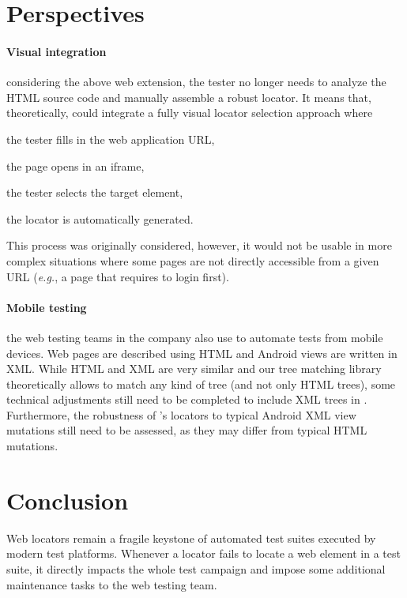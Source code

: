 \section{Perspectives}\label{cerberus:sec:perspectives}
\paragraph{Visual integration}
considering the above \erratum web extension, the tester no longer needs to analyze the HTML source code and manually assemble a robust locator.
It means that, theoretically, \cerberus could integrate a fully visual locator selection approach where
\begin{inparaenum}[\em (i)]
    \item the tester fills in the web application URL,
    \item the page opens in an iframe,
    \item the tester selects the target element,
    \item the \erratum locator is automatically generated.
\end{inparaenum}
This process was originally considered, however, it would not be usable in more complex situations where some pages are not directly accessible from a given URL (\emph{e.g.}, a page that requires to login first).

\paragraph{Mobile testing}
the web testing teams in the \laredoute{} company also use \cerberus to automate tests from mobile devices.
Web pages are described using HTML and Android views are written in XML.
While HTML and XML are very similar and our tree matching library theoretically allows \erratum to match any kind of tree (and not only HTML trees), some technical adjustments still need to be completed to include XML trees in \cerberus.
Furthermore, the robustness of \erratum's locators to typical Android XML view mutations still need to be assessed, as they may differ from typical HTML mutations.

\section{Conclusion}\label{cerberus:sec:conclusion}
Web locators remain a fragile keystone of automated test suites executed by modern test platforms.
Whenever a locator fails to locate a web element in a test suite, it directly impacts the whole test campaign and impose some additional maintenance tasks to the web testing team.

